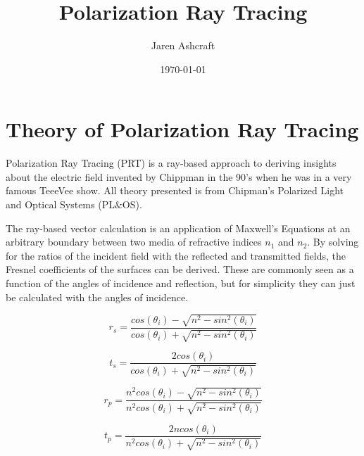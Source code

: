 \documentclass{article}
\title{Polarization Ray Tracing}
\author{Jaren Ashcraft}
\date{\today}
\begin{document}
	
	\maketitle
	
	\section{Theory of Polarization Ray Tracing}
	Polarization Ray Tracing (PRT) is a ray-based approach to deriving insights about the electric field invented by Chippman in the 90's when he was in a very famous TeeeVee show. All theory presented is from Chipman's Polarized Light and Optical Systems (PL$\&$OS).
	
	The ray-based vector calculation is an application of Maxwell's Equations at an arbitrary boundary between two media of refractive indices $n_1$ and $n_2$. By solving for the ratios of the incident field with the reflected and transmitted fields, the Fresnel coefficients of the surfaces can be derived. These are commonly seen as a function of the angles of incidence and reflection, but for simplicity they can just be calculated with the angles of incidence.
	
	\begin{equation}
		r_s = \frac{cos(\theta_i) - \sqrt{n^2 - sin^2(\theta_i)}}{cos(\theta_i) + \sqrt{n^2 - sin^2(\theta_i)}}
	\end{equation}

	\begin{equation}
		t_s = \frac{2cos(\theta_i)}{cos(\theta_i) + \sqrt{n^2 - sin^2(\theta_i)}}
	\end{equation}

	\begin{equation}
		r_p = \frac{n^2 cos(\theta_i) - \sqrt{n^2 - sin^2(\theta_i)}}{n^2 cos(\theta_i) + \sqrt{n^2 - sin^2(\theta_i)}}
	\end{equation}

	\begin{equation}
		t_p = \frac{2n cos(\theta_i)}{n^2 cos(\theta_i) + \sqrt{n^2 - sin^2(\theta_i)}}
	\end{equation}
\end{document}
